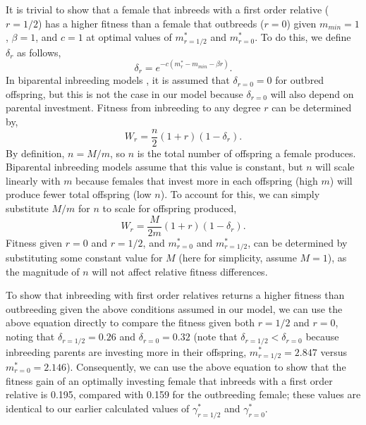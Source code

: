 \documentclass[12pt]{article}
\begin{document}
It is trivial to show that a female that inbreeds with a first order relative ($r=1/2$) has a higher fitness than a female that outbreeds ($r=0$) given $m_{min}=1$, $\beta=1$, and $c=1$ at optimal values of $m^{*}_{r=1/2}$ and $m^{*}_{r=0}$. To do this, we define $\delta_{r}$ as follows,
\begin{equation}
\delta_{r} = e^{-c(m^{*}_{r}-m_{min}-\beta r)}.
\end{equation}
In biparental inbreeding models \cite[e.g.,][]{Kokko2006, Parker2006, Duthie2015a}, it is assumed that $\delta_{r=0}=0$ for outbred offspring, but this is not the case in our model because $\delta_{r=0}$ will also depend on parental investment. Fitness from inbreeding to any degree $r$ can be determined by,
\begin{equation}
W_{r} = \frac{n}{2}\left(1+r\right)\left(1-\delta_{r}\right).
\end{equation}
By definition, $n = M/m$, so $n$ is the total number of offspring a female produces. Biparental inbreeding models assume that this value is constant, but $n$ will scale linearly with $m$ because females that invest more in each offspring (high $m$) will produce fewer total offspring (low $n$). To account for this, we can simply substitute $M/m$ for $n$ to scale for offspring produced,
\begin{equation}
W_{r} = \frac{M}{2 m}\left(1+r\right)\left(1-\delta_{r}\right).
\end{equation}
Fitness given $r=0$ and $r=1/2$, and $m^{*}_{r=0}$ and $m^{*}_{r=1/2}$, can be determined by substituting some constant value for $M$ (here for simplicity, assume $M=1$), as the magnitude of $n$ will not affect relative fitness differences. 

To show that inbreeding with first order relatives returns a higher fitness than outbreeding given the above conditions assumed in our model, we can use the above equation directly to compare the fitness given both $r=1/2$ and $r=0$, noting that $\delta_{r=1/2}=0.26$ and $\delta_{r=0}=0.32$ (note that $\delta_{r=1/2}<\delta_{r=0}$ because inbreeding parents are investing more in their offspring, $m^{*}_{r=1/2}=2.847$ versus $m^{*}_{r=0}=2.146$). Consequently, we can use the above equation to show that the fitness gain of an optimally investing female that inbreeds with a first order relative is 0.195, compared with 0.159 for the outbreeding female; these values are identical to our earlier calculated values of $\gamma^{*}_{r=1/2}$ and $\gamma^{*}_{r=0}$.
\end{document}
